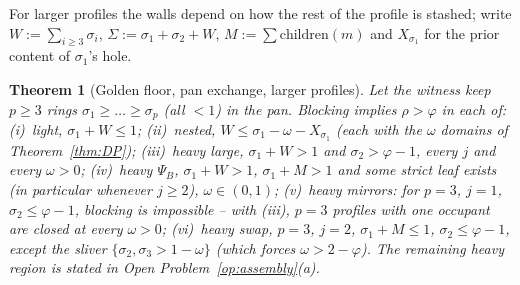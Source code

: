 \documentclass[11pt]{article}
\newtheorem{theorem}{Theorem}
\theoremstyle{definition}
\begin{document}
For larger profiles the walls depend on how the rest of the profile is
stashed; write $W:=\sum_{i\ge3}\sigma_i$, $\Sigma:=\sigma_1+\sigma_2+W$,
$M:=\sum\mathrm{children}(m)$ and $X_{\sigma_1}$ for the prior content
of $\sigma_1$'s hole.

\begin{theorem}[Golden floor, pan exchange, larger profiles]\label{thm:DPp}
Let the witness keep $p\ge3$ rings $\sigma_1\ge\dots\ge\sigma_p$
(all $<1$) in the pan. Blocking implies $\rho>\varphi$ in each of:
(i)~\emph{light}, $\sigma_1+W\le1$; (ii)~\emph{nested},
$W\le\sigma_1-\omega-X_{\sigma_1}$ (each with the $\omega$ domains of
Theorem~\ref{thm:DP}); (iii)~\emph{heavy large}, $\sigma_1+W>1$ and
$\sigma_2>\varphi-1$, every $j$ and every $\omega>0$;
(iv)~\emph{heavy $\Psi_B$}, $\sigma_1+W>1$, $\sigma_1+M>1$ and some
strict leaf exists (in particular whenever $j\ge2$), $\omega\in(0,1)$;
(v)~\emph{heavy mirrors}: for $p=3$, $j=1$, $\sigma_2\le\varphi-1$,
blocking is \emph{impossible} -- with (iii), $p=3$ profiles with one
occupant are closed at every $\omega>0$; (vi)~\emph{heavy swap}, $p=3$,
$j=2$, $\sigma_1+M\le1$, $\sigma_2\le\varphi-1$, except the sliver
$\{\sigma_2,\sigma_3>1-\omega\}$ (which forces $\omega>2-\varphi$).
The remaining heavy region is stated in Open
Problem~\ref{op:assembly}(a).
\end{theorem}
\end{document}
